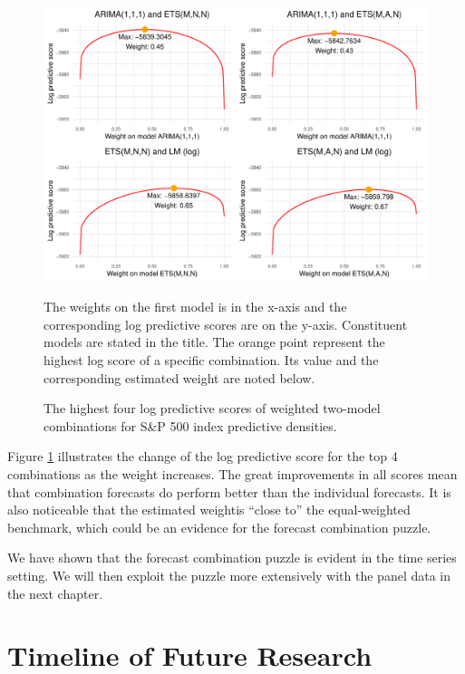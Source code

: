 \documentclass{monashthesis}
\begin{document}
\begin{figure}[ht]
\centering
\caption{The highest four log predictive scores of weighted two-model combinations for S\&P 500 index predictive densities.}
\includegraphics{figures/best4comb.pdf}
\begin{flushleft}
{\footnotesize The weights on the first model is in the x-axis and the corresponding log predictive scores are on the y-axis. Constituent models are stated in the title. The orange point represent the highest log score of a specific combination. Its value and the corresponding estimated weight are noted below.}\\
\end{flushleft}
\label{fig:best4}
\end{figure}

Figure \ref{fig:best4} illustrates the change of the log predictive score for the top 4 combinations as the weight increases. The great improvements in all scores mean that combination forecasts do perform better than the individual forecasts. It is also noticeable that the estimated weightis ``close to'' the equal-weighted benchmark, which could be an evidence for the forecast combination puzzle.

We have shown that the forecast combination puzzle is evident in the time series setting. We will then exploit the puzzle more extensively with the panel data in the next chapter.

\hypertarget{timeline-of-future-research}{%
\section{Timeline of Future Research}\label{timeline-of-future-research}}
\end{document}
